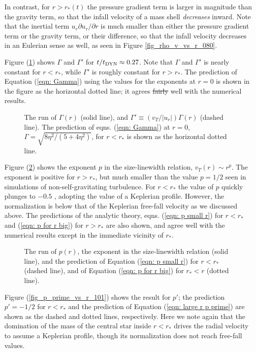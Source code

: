 \documentclass[iop,apj,numberedappendix]{emulateapj}
\newcommand       \phil[1]      {{\color{blue} #1}}
\newcommand       \etaeff       {\eta}
\begin{document}
In contrast, for $r>r_*(t)$ the pressure gradient term is larger in
magnitude than the gravity term, so that the infall velocity of a mass
shell {\em decreases} inward.  Note that the inertial term
$u_r\partial u_r/\partial r$ is much smaller than either the pressure
gradient term or the gravity term, or their difference, so that the
infall velocity decreases in an Eulerian sense as well, as seen in
Figure \ref{fig_rho_v_vs_r_080}. 


Figure (\ref{fig_Gamma_vs_r_150}) shows $\Gamma$ and $\Gamma'$ \phil{for $t/t_{\rm DYN}\approx 0.27$}. Note
that $\Gamma$\phil{and $\Gamma'$} is nearly constant for $r<r_*$, while $\Gamma'$ is
roughly constant for $r>r_*$. The prediction of Equation (\ref{eqn:
  Gamma}) using the values for the exponents at
$r=0$ is shown in the figure as the horizontal dotted line; it agrees
\phil{\sout{fairly}} well with the numerical results.


\begin{figure}
\caption{\label{fig_Gamma_vs_r_150}The run of $\Gamma(r)$ (solid
  line), and $\Gamma'\equiv (v_T/|u_r|)\Gamma(r)$ (dashed line). The prediction of
  eqns. (\ref{eqn: Gamma}) at $r=0$,
  $\Gamma=\sqrt{8\etaeff^2/(5+4\etaeff^2)}$, for $r<r_*$ is shown as
  the horizontal dotted line.}
\end{figure}


Figure (\ref{fig_p_vs_r_101}) shows the exponent $p$ in the
size-linewidth relation, $v_T(r)\sim r^p$. The exponent is positive
for $r>r_*$, but much smaller than the value $p=1/2$ seen in
simulations of non-self-gravitating turbulence. For $r<r_*$ the value
of $p$ quickly plunges to $-0.5$\phil{, adopting the value of a Keplerian profile. However, the normalization is below that of the Keplerian free-fall velocity as we discussed above}. The predictions of the analytic
theory, eqns. (\ref{eqn: p small r}) for $r<r_*$ and (\ref{eqn:
  p for r big}) for $r>r_*$ are also
shown, and agree well with the numerical results except in the
immediate vicinity of $r_*$.


\begin{figure}
\caption{\label{fig_p_vs_r_101}The run of $p(r)$, the exponent in the
  size-linewidth relation (solid line),
  and the prediction of Equation (\ref{eqn: p small r}) for $r<r_*$ (dashed line),
  and of Equation (\ref{eqn: p for r big}) for $r_*<r$ (dotted line). }
\end{figure} %

Figure (\ref{fig_p_prime_vs_r_101}) shows the result for $p'$; the
prediction $p'=-1/2$ for $r<r_*$ and the prediction of
Equation (\ref{eqn: large r p prime}) are shown as the dashed and dotted
lines, respectively.  
\phil{Here we note again that the domination of the mass of the
  central star inside $r<r_*$ drives the radial velocity to assume a
  Keplerian profile, though its normalization does not reach free-fall values.}
\end{document}

